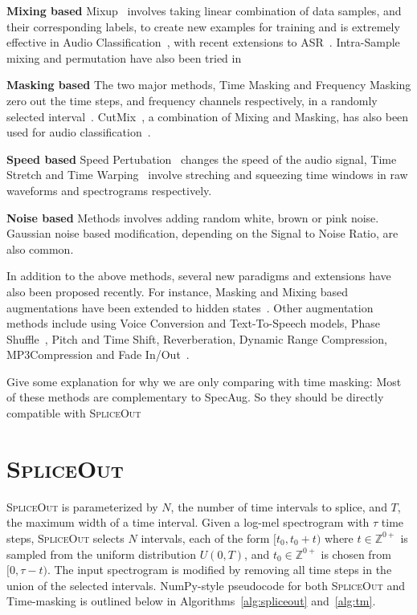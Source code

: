 \documentclass{article}
\newcommand{\SpA}{{\textsc{SpliceOut}}\xspace}
\begin{document}
\textbf{Mixing based} Mixup~\citep{zhang2018mixup} involves taking linear combination of data samples, and their corresponding labels, to create new examples for training and is extremely effective in Audio Classification~\citep{panns}, with recent extensions to ASR~\citep{meng2021mixspeech}. Intra-Sample mixing and permutation have also been tried in~\citep{Carr_2021,specswap}

\textbf{Masking based}
The two major methods, Time Masking and Frequency Masking  zero out the time steps, and frequency channels respectively, in a randomly selected interval~\citep{specaugment}. CutMix~\citep{yun2019cutmix}, a combination of Mixing and Masking,  has also been used for audio classification~\citep{deepspectrumlite}.

\textbf{Speed based} 
Speed Pertubation~\citep{speedpertubation} changes the speed of the audio signal, Time Stretch and Time Warping~\citep{specaugment} involve streching and squeezing time windows in raw waveforms and spectrograms respectively. 

\textbf{Noise based} Methods involves adding random white, brown or pink noise. Gaussian noise based modification, depending on the Signal to Noise Ratio, are also common.

In addition to the above methods, several new paradigms and extensions have also been proposed recently. For instance, Masking and Mixing based augmentations have been extended to hidden states~\citep{specaugmentpp}. Other augmentation methods include using Voice Conversion and Text-To-Speech models, Phase Shuffle~\citep{donahue2019adversarial}, Pitch and Time Shift, Reverberation, Dynamic Range Compression, MP3Compression and Fade In/Out~\citep{librosa,clar}. 

Give some explanation for why we are only comparing with time masking: Most of these methods are complementary to SpecAug. So they should be directly compatible with \SpA
\fi

\section{\SpA}
\SpA is parameterized by $N$, the number of time intervals to splice, and $T$, the maximum width of a time interval. Given a log-mel spectrogram with $\tau$ time steps, \SpA selects $N$ intervals, each of the form $[t_0, t_0+t)$ where $t \in \mathbb{Z}^{0+}$ is sampled from the uniform distribution $U(0, T)$, and $t_0 \in \mathbb{Z}^{0+}$ is chosen from $[0, \tau - t)$. The input spectrogram is modified by removing all time steps in the union of the selected intervals. NumPy-style pseudocode for both \SpA and Time-masking is outlined below in Algorithms~\ref{alg:spliceout} and~\ref{alg:tm}. 
\end{document}
